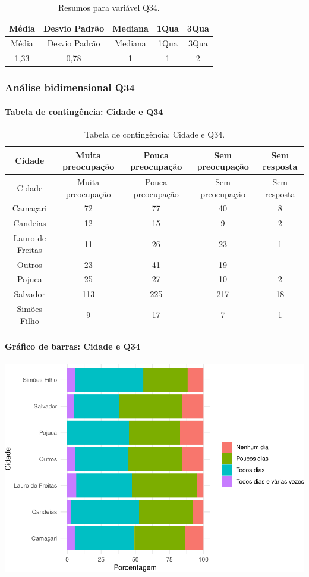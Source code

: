 \documentclass[]{article}
\let\oldparagraph\paragraph
\renewcommand{\paragraph}[1]{\oldparagraph{#1}\mbox{}}
\begin{document}
\begin{longtable}[]{@{}ccccc@{}}
\caption{\label{tab:unnamed-chunk-1192}Resumos para variável Q34.}\tabularnewline
\toprule
Média & Desvio Padrão & Mediana & 1Qua & 3Qua\tabularnewline
\midrule
\endfirsthead
\toprule
Média & Desvio Padrão & Mediana & 1Qua & 3Qua\tabularnewline
\midrule
\endhead
1,33 & 0,78 & 1 & 1 & 2\tabularnewline
\bottomrule
\end{longtable}

\cleardoublepage

\hypertarget{anuxe1lise-bidimensional-q34}{%
\subsubsection{Análise bidimensional Q34}\label{anuxe1lise-bidimensional-q34}}

\hypertarget{tabela-de-continguxeancia-cidade-e-q34}{%
\paragraph{Tabela de contingência: Cidade e Q34}\label{tabela-de-continguxeancia-cidade-e-q34}}

\begin{longtable}[]{@{}ccccc@{}}
\caption{\label{tab:unnamed-chunk-1193}Tabela de contingência: Cidade e Q34.}\tabularnewline
\toprule
Cidade & Muita preocupação & Pouca preocupação & Sem preocupação & Sem resposta\tabularnewline
\midrule
\endfirsthead
\toprule
Cidade & Muita preocupação & Pouca preocupação & Sem preocupação & Sem resposta\tabularnewline
\midrule
\endhead
Camaçari & 72 & 77 & 40 & 8\tabularnewline
Candeias & 12 & 15 & 9 & 2\tabularnewline
Lauro de Freitas & 11 & 26 & 23 & 1\tabularnewline
Outros & 23 & 41 & 19 &\tabularnewline
Pojuca & 25 & 27 & 10 & 2\tabularnewline
Salvador & 113 & 225 & 217 & 18\tabularnewline
Simões Filho & 9 & 17 & 7 & 1\tabularnewline
\bottomrule
\end{longtable}

\hypertarget{gruxe1fico-de-barras-cidade-e-q34}{%
\paragraph{Gráfico de barras: Cidade e Q34}\label{gruxe1fico-de-barras-cidade-e-q34}}

\begin{center}\includegraphics[width=0.75\linewidth]{relatorio_covid19_files/figure-latex/unnamed-chunk-1194-1} \end{center}
\end{document}
